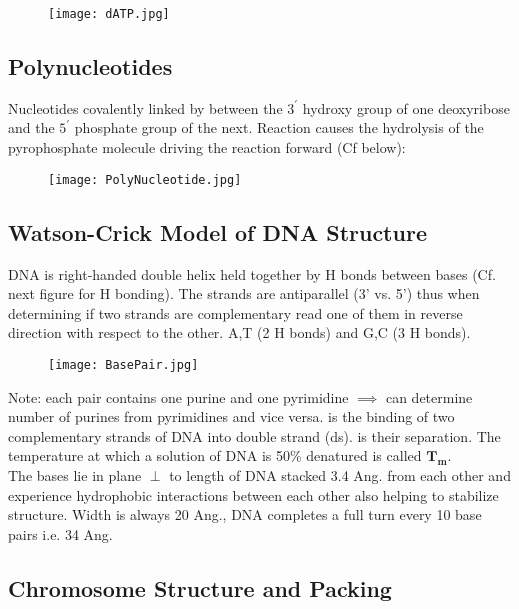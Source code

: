 \documentclass[../Bio_chemistryReview.tex]{subfiles}
\begin{document}
\begin{figure}[h]
  \centering
  \texttt{[image: dATP.jpg]}
\end{figure}
\subsection{Polynucleotides}

Nucleotides covalently linked by  between the $
3^{\prime} $ hydroxy group of one deoxyribose and the $ 5^{\prime} $ phosphate
group of the next. Reaction causes the hydrolysis of the pyrophosphate molecule
driving the reaction forward (Cf below):

\begin{figure}[H]
  \centering
  \texttt{[image: PolyNucleotide.jpg]}
\end{figure}

\subsection{Watson-Crick Model of DNA Structure}

DNA is right-handed double helix held together by H bonds between bases (Cf.
next figure for H bonding). The strands are antiparallel (3' vs. 5') thus when
determining if two strands are complementary read one of them in reverse
direction with respect to the other. A,T (2 H bonds) and G,C (3 H bonds).
\begin{figure}[h]
  \centering
  \texttt{[image: BasePair.jpg]}
\end{figure}

Note: each pair contains one purine and one pyrimidine $ \implies $ can
determine number of purines from pyrimidines and vice versa.  is the binding of two complementary strands of DNA into double
strand (ds).  is their separation. The temperature at which
a solution of DNA is 50\% denatured is called $ \boldsymbol{ T_{m} } $.\\
The bases lie in plane $ \perp $ to length of DNA stacked 3.4 Ang. from each
other and experience hydrophobic interactions between each other also helping to
stabilize structure. Width is always 20 Ang., DNA completes a full turn every 10
base pairs i.e. 34 Ang. 

\subsection{Chromosome Structure and Packing}
\end{document}

